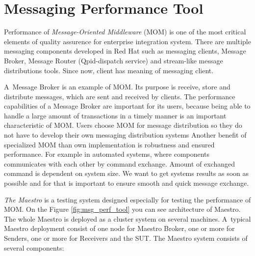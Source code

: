 
\chapter{Messaging Performance Tool}
\label{Messaging Performance Tool}
Performance of \emph{Message-Oriented Middleware} (MOM) \cite{CURRY:MOM} is one of the most critical elements of quality assurence for enterprise integration system. There are multiple messaging components developed in Red Hat such as messaging clients, Message Broker, Message Router (Qpid-dispatch service) and stream-like message distributions tools. Since now, client has meaning of messaging client.  

A~Message Broker is an example of MOM. Its purpose is receive, store and distribute messages, which are sent and received by clients. The performance capabilities of a Message Broker are important for its users, because being able to handle a large amount of transactions in a timely manner is an important characteristic of MOM. Users choose MOM for message distribution so they do not have to develop their own messaging distribution systems Another benefit of specialized MOM than own implementation is robustness and ensured performance. For example in automated systems, where components communicates with each other by command exchange. Amount of exchanged command is dependent on system size. We want to get systems results as soon as possible and for that is important to ensure smooth and quick message exchange.

\emph{The Maestro} \cite{ORPISKE:MSGPT} is a testing system designed especially for testing the performance of MOM. On the Figure \ref{fig:msg_perf_tool} you can see architecture of Maestro. The whole Maestro is deployed as a cluster system on several machines. A~typical Maestro deployment consist of one node for Maestro Broker, one or more for Senders, one or more for Receivers and the SUT. The Maestro system consists of several components:

